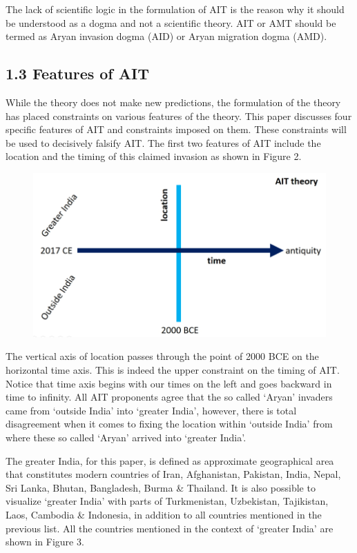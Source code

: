 The lack of scientific logic in the formulation of AIT is the reason why it should be understood as a dogma and not a scientific theory. AIT or AMT should be termed as Aryan invasion dogma (AID) or Aryan migration dogma (AMD).


\subsection*{1.3 Features of AIT}

While the theory does not make new predictions, the formulation of the theory has placed constraints on various features of the theory. This paper discusses four specific features of AIT and constraints imposed on them. These constraints will be used to decisively falsify AIT. The first two features of AIT include the location and the timing of this claimed invasion as shown in Figure 2.

\begin{figure}[!htbp]
\includegraphics[scale=0.25]{"images/8-02.jpg"}
\caption{}\label{art8-fig02}
\end{figure}

The vertical axis of location passes through the point of 2000 BCE on the horizontal time axis. This is indeed the upper constraint on the timing of AIT. Notice that time axis begins with our times on the left and goes backward in time to infinity. All AIT proponents agree that the so called ‘Aryan’ invaders came from ‘outside India’ into ‘greater India’, however, there is total disagreement when it comes to fixing the location within ‘outside India’ from where these so called ‘Aryan’ arrived into ‘greater India’.

The greater India, for this paper, is defined as approximate geographical area that constitutes modern countries of Iran, Afghanistan, Pakistan, India, Nepal, Sri Lanka, Bhutan, Bangladesh, Burma \& Thailand. It is also possible to visualize ‘greater India’ with parts of Turkmenistan, Uzbekistan, Tajikistan, Laos, Cambodia \& Indonesia, in addition to all countries mentioned in the previous list. All the countries mentioned in the context of ‘greater India’ are shown in Figure 3.

